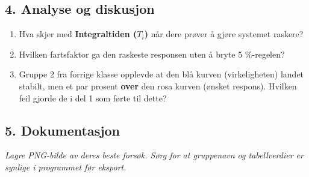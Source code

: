 \documentclass[a4paper,11pt]{article}
\begin{document}
\subsection*{4. Analyse og diskusjon}
\begin{enumerate}
    \item Hva skjer med \textbf{Integraltiden ($T_i$)} når dere prøver å gjøre systemet raskere? \\
    \hrulefill
    \item Hvilken fartsfaktor ga den raskeste responsen uten å bryte 5 \%-regelen? \\
    \hrulefill
    \item Gruppe 2 fra forrige klasse opplevde at den blå kurven (virkeligheten) landet stabilt, men et par prosent \textbf{over} den rosa kurven (ønsket respons). Hvilken feil gjorde de i del 1 som førte til dette? \\
    \hrulefill
\end{enumerate}

\subsection*{5. Dokumentasjon}
\textit{Lagre PNG-bilde av deres beste forsøk. Sørg for at gruppenavn og tabellverdier er synlige i programmet før eksport.}
\end{document}
